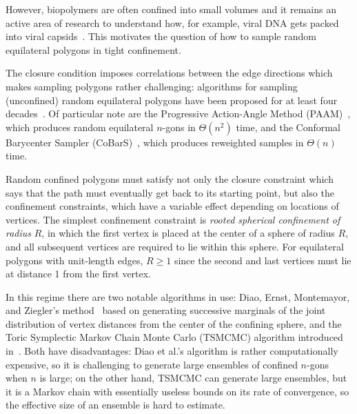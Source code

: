 \documentclass{article}
\theoremstyle{definition}
\begin{document}
However, biopolymers are often confined into small volumes and it remains an active area of research to understand how, for example, viral DNA gets packed into viral capsids~\cite{landerDNABendinginducedPhase2013,marenduzzoDNADNAInteractions2009,michelettiSimulationsKnottingConfined2008,arsuagaDNAKnotsReveal2005,arsuagaKnottingProbabilityDNA2002,jardineDNAPackagingDoublestranded2005,reithEffectiveStiffeningDNA2012}. This motivates the question of how to sample random equilateral polygons in tight confinement.

The closure condition imposes correlations between the edge directions which makes sampling polygons rather challenging: algorithms for sampling (unconfined) random equilateral polygons have been proposed for at least four decades~\cite{alvaradoGenerationRandomEquilateral2011,kleninEffectExcludedVolume1988,plunkettTotalCurvatureTotal2007,varelaFastErgodicAlgorithm2009,millettKnottingRegularPolygons1994,mooreTopologicallyDrivenSwelling2004,mooreLimitsAnalogySelfavoidance2005,vologodskiiStatisticalMechanicsSupercoils1979,cantarellaSymplecticGeometryClosed2016,cantarellaFastDirectSampling2016,cantarellaFasterDirectSampling2024,cantarellaCoBarSFastReweighted2024,diaoGeneratingEquilateralRandom2011,diaoGeneratingEquilateralRandom2012a,diaoGeneratingEquilateralRandom2012}. Of particular note are the Progressive Action-Angle Method (PAAM)~\cite{cantarellaFasterDirectSampling2024}, which produces random equilateral $n$-gons in $\Theta(n^2)$ time, and the Conformal Barycenter Sampler (CoBarS)~\cite{cantarellaCoBarSFastReweighted2024}, which produces reweighted samples in $\Theta(n)$ time.

Random confined polygons must satisfy not only the closure constraint which says that the path must eventually get back to its starting point, but also the confinement constraints, which have a variable effect depending on locations of vertices. The simplest confinement constraint is \emph{rooted spherical confinement of radius} $R$, in which the first vertex is placed at the center of a sphere of radius $R$, and all subsequent vertices are required to lie within this sphere. For equilateral polygons with unit-length edges, $R \geq 1$ since the second and last vertices must lie at distance 1 from the first vertex. 

In this regime there are two notable algorithms in use: Diao, Ernst, Montemayor, and Ziegler's method~\cite{diaoGeneratingEquilateralRandom2012a} based on generating successive marginals of the joint distribution of vertex distances from the center of the confining sphere, and the Toric Symplectic Markov Chain Monte Carlo (TSMCMC) algorithm introduced in~\cite{cantarellaSymplecticGeometryClosed2016}. Both have disadvantages: Diao et al.'s algorithm is rather computationally expensive, so it is challenging to generate large ensembles of confined $n$-gons when $n$ is large; on the other hand, TSMCMC can generate large ensembles, but it is a Markov chain with essentially useless bounds on its rate of convergence, so the effective size of an ensemble is hard to estimate.
\end{document}
